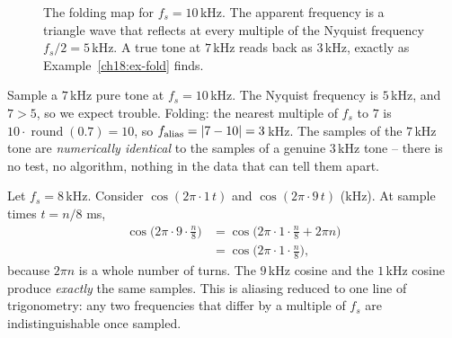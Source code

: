 \begin{figure}[H]
\centering
{}
\caption{The folding map for $f_s = 10$\,kHz. The apparent frequency is a triangle wave
that reflects at every multiple of the Nyquist frequency $f_s/2 = 5$\,kHz. A true tone
at $7$\,kHz reads back as $3$\,kHz, exactly as Example~\ref{ch18:ex-fold} finds.}
\label{ch18:fig-folding}
\end{figure}

\begin{example}
\label{ch18:ex-fold}
Sample a $7$\,kHz pure tone at $f_s = 10$\,kHz. The Nyquist frequency is $5$\,kHz, and
$7 > 5$, so we expect trouble. Folding: the nearest multiple of $f_s$ to $7$ is
$10\cdot\operatorname{round}(0.7)=10$, so
$f_{\text{alias}} = \lvert7 - 10\rvert = 3$\,kHz. The samples of the $7$\,kHz tone are
\emph{numerically identical} to the samples of a genuine $3$\,kHz tone -- there is no
test, no algorithm, nothing in the data that can tell them apart.
\end{example}

\begin{example}
\label{ch18:ex-two-cos}
Let $f_s = 8$\,kHz. Consider $\cos(2\pi\cdot 1\,t)$ and $\cos(2\pi\cdot 9\,t)$ (kHz).
At sample times $t = n/8$ ms,
\begin{align*}
  \cos\!\Big(2\pi\cdot 9 \cdot \frac{n}{8}\Big)
  &= \cos\!\Big(2\pi\cdot 1 \cdot \frac{n}{8} + 2\pi n\Big) \\
  &= \cos\!\Big(2\pi\cdot 1 \cdot \frac{n}{8}\Big),
\end{align*}
because $2\pi n$ is a whole number of turns. The $9$\,kHz cosine and the $1$\,kHz cosine
produce \emph{exactly} the same samples. This is aliasing reduced to one line of
trigonometry: any two frequencies that differ by a multiple of $f_s$ are
indistinguishable once sampled.
\end{example}

